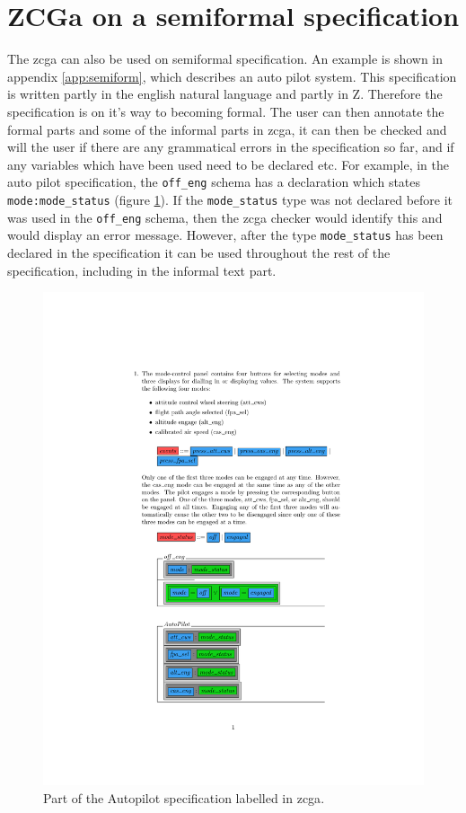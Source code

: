\section{ZCGa on a semiformal specification}

The \gls{zcga} can also be used on semiformal specification. An example is shown
in appendix \ref{app:semiform}, which describes an auto pilot system. This
specification is written partly in the english natural language and partly in Z.
Therefore the specification is on it's way to becoming formal. The user can then
annotate the formal parts and some of the informal parts in \gls{zcga}, it can
then be checked and will the user if there are any grammatical errors in the
specification so far, and if any variables which have been used need to be
declared etc. For example, in the auto pilot specification, the \verb|off_eng|
schema has a declaration which states \verb|mode:mode_status| (figure
\ref{fig:zcgautopilot}). If the \verb|mode_status| type was not declared before
it was used in the \verb|off_eng| schema, then the \gls{zcga} checker would
identify this and would display an error message. However, after the type
\verb|mode_status| has been declared in the specification it can be used
throughout the rest of the specification, including in the informal text part.

\begin{figure}[H]
\centering
\includegraphics[clip, trim=3.5cm 10cm 1.5cm 2cm, scale=0.6]{examples/semiform/1.pdf}
\caption{Part of the Autopilot specification labelled in \gls{zcga}. \label{fig:zcgautopilot}}
\end{figure}


